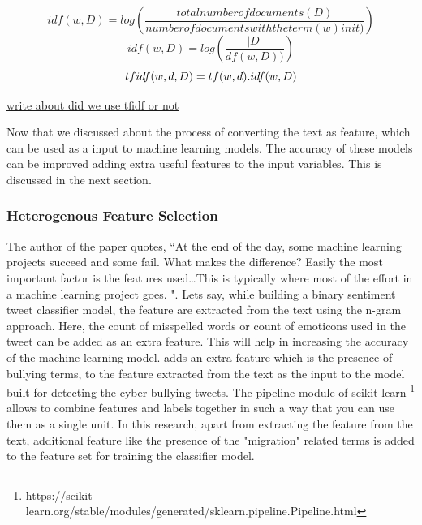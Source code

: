 \begin{equation}
\label{eqn:5}
idf(w,D) = log (\frac{total number of documents(D)}{number of documents with the term(w) in it)})
\end{equation}
\begin{equation}
\label{eqn:6}
idf(w,D) = log (\frac{|D|}{df(w,D))})
\end{equation}
\begin{equation}
\label{eqn:7}
tf\-idf(w,d,D) = tf(w,d) . idf(w,D)
\end{equation}


\underline{write about  did we use tfidf or not}

Now that we discussed about the process of converting the text as feature, which can be used as a input to machine learning models. The accuracy of these models can be improved adding extra useful features to the input variables. This is discussed in the next section.


\subsubsection{Heterogenous Feature Selection}
The author of the paper \cite{Domingos:2012} quotes, ``At the end of the day, some machine learning projects succeed and some fail. What makes the difference? Easily the most important factor is the features used…This is typically where most of the effort in a machine learning project goes. ".  Lets say, while building a binary sentiment tweet classifier model, the feature are extracted from the text using the n-gram approach. Here, the count of misspelled words or count of emoticons used in the tweet can be added as an extra feature. This will help in increasing the accuracy of the machine learning model. \cite{Cortis} adds an extra feature which is the presence of bullying terms, to the feature extracted from the text as the input to the model built for detecting the cyber bullying tweets. The pipeline module of scikit-learn \cite{scikit-learn} \footnote{https://scikit-learn.org/stable/modules/generated/sklearn.pipeline.Pipeline.html} allows to combine features and labels together in such a way that you can use them as a single unit. In this research, apart from extracting the feature from the text, additional feature like the presence of the "migration" related terms is added to the feature set for training the classifier model. 
